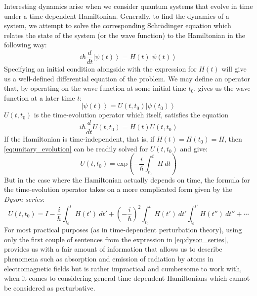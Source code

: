 \documentclass[12pt,a4paper]{article}
\begin{document}
	Interesting dynamics arise when we consider quantum systems that evolve in time under a time-dependent Hamiltonian. Generally, to find the dynamics of a system, we attempt to solve the corresponding Schr\"{o}dinger equation which relates the state of the system (or the wave function) to the Hamiltonian in the following way:
	\begin{equation}
		i \hbar \frac{d}{dt} \left| \psi(t) \right\rangle = H(t) \left| \psi(t) \right\rangle
		\label{eq:schrodinger}
	\end{equation}
	Specifying an initial condition alongside with the expression for $H(t)$ will give us a well-defined differential equation of the problem. We may define an operator that, by operating on the wave function at some initial time $t_{0}$, gives us the wave function at a later time $t$:
	\begin{equation}
		\left| \psi(t) \right\rangle = U(t, t_{0}) \left| \psi(t_{0}) \right\rangle
		\label{eq:time_evolution_operator}
	\end{equation}
	$U(t, t_{0})$ is the time-evolution operator which itself, satisfies the equation
	\begin{equation}
		i \hbar \frac{d}{dt} U(t, t_{0}) = H(t) U(t, t_{0})
		\label{eq:unitary_evolution}
	\end{equation}
	If the Hamiltonian is time-independent, that is, if $H(t) = H(t_{0}) = H$, then \eqref{eq:unitary_evolution} can be readily solved for $U(t, t_{0})$ and give:
	\begin{equation}
		U(t, t_{0}) = \mathrm{exp} \left( - \frac{i}{\hbar} \int_{t_{0}}^{t} H\ dt \right)
		\label{eq:time_independent_U}
	\end{equation}
	But in the case where the Hamiltonian actually depends on time, the formula for the time-evolution operator takes on a more complicated form given by the \emph{Dyson series}:
	\begin{equation}
		U(t, t_{0}) = I - \frac{i}{\hbar} \int_{t_{0}}^{t} H(t')\ dt' + \left( -\frac{i}{\hbar} \right)^{2} \int_{t_{0}}^{t}H(t')\ dt' \int_{t_{0}}^{t'} H(t'')\ dt'' + \cdots
		\label{eq:dyson_series}
	\end{equation}
	For most practical purposes (as in time-dependent perturbation theory), using only the first couple of sentences from the expression in \eqref{eq:dyson_series}, provides us with a fair amount of information that allows us to describe phenomena such as absorption and emission of radiation by atoms in electromagnetic fields but is rather impractical and cumbersome to work with, when it comes to considering general time-dependent Hamiltonians which cannot be considered as perturbative.
	
\end{document}
